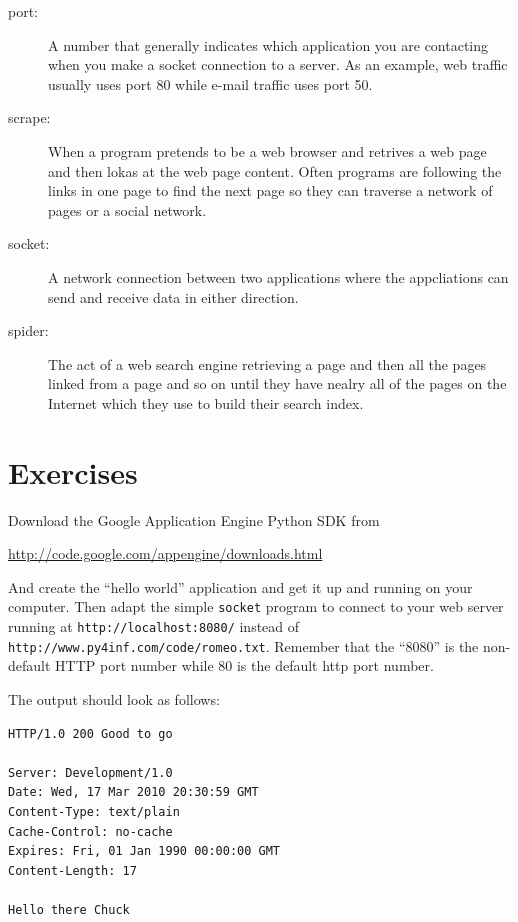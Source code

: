 \begin{description}

\item[port:] A number that generally indicates which application 
you are contacting when you make a socket connection to a server.
As an example, web traffic usually uses port 80 while e-mail 
traffic uses port 50.

\item[scrape:] When a program pretends to be a web browser and
retrives a web page and then lokas at the web page content. 
Often programs are following the links in one page to find the next
page so they can traverse a network of pages or a social network.

\item[socket:] A network connection between two applications
where the appcliations can send and receive data in either direction.

\item[spider:] The act of a web search engine retrieving a page and
then all the pages linked from a page and so on until they have 
nealry all of the pages on the Internet which they 
use to build their search index.

\end{description}

\section{Exercises}

\begin{ex}
Download the Google Application Engine Python SDK from 

\url{http://code.google.com/appengine/downloads.html}

And create the ``hello world'' application and get it up and running
on your computer.  Then adapt the simple {\tt socket} program to 
connect to your web server running at {\tt http://localhost:8080/}
instead of {\tt http://www.py4inf.com/code/romeo.txt}.  Remember that
the ``8080'' is the non-default HTTP port number while 80 is the 
default http port number.

The output should look as follows:
\beforeverb
\begin{verbatim}
HTTP/1.0 200 Good to go

Server: Development/1.0
Date: Wed, 17 Mar 2010 20:30:59 GMT
Content-Type: text/plain
Cache-Control: no-cache
Expires: Fri, 01 Jan 1990 00:00:00 GMT
Content-Length: 17

Hello there Chuck
\end{verbatim}
\afterverb
%
\end{ex}

